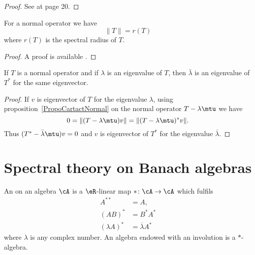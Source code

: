 \begin{proof}
    See \cite{AndrewGreen} at page 20.
\end{proof}

\begin{proposition}
    For a normal operator we have
    \begin{equation}
        \| T \|=r(T)
    \end{equation}
    where \( r(T)\) is the spectral radius of \( T\).
\end{proposition}

\begin{proof}
    A proof is available .
\end{proof}

\begin{proposition}
    If \( T\) is a normal operator and if \( \lambda\) is an eigenvalue of \( T\), then \( \bar\lambda\) is an eigenvalue of \( T^*\) for the same eigenvector.
\end{proposition}

\begin{proof}
    If \( v\) is eigenvector of \( T\) for the eigenvalue \( \lambda\), using proposition~\ref{PropoCartactNormal} on the normal operator \( T-\lambda\mtu\) we have
    \begin{equation}
        0=\| (T-\lambda\mtu)v \|=\| (T-\lambda\mtu)^*v \|.
    \end{equation}
    Thus \( (T^*-\bar\lambda \mtu)v=0\) and \( v\) is eigenvector of \( T^*\) for the eigenvalue \( \bar\lambda\).
\end{proof}

\section{Spectral theory on Banach algebras}		\label{Sec_SpecBanach}

\begin{definition}      \label{DefInvolutionALge}
    An  on an algebra $\cA$ is a $\eR$-linear map $*\colon \cA\to \cA$ which fulfils
    \begin{subequations}
    \begin{align}
      A^{**}&=A,\\
        (AB)^*&=B^*A^*\\
        (\lambda A)^*&=\overline{\lambda }A^*
    \end{align}
    \end{subequations}
    where $\lambda$ is any complex number. An algebra endowed with an involution is a $*$-algebra.
\end{definition}

